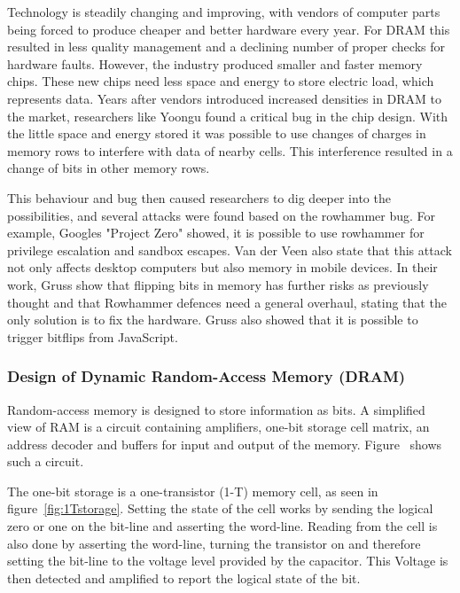 Technology is steadily changing and improving, with vendors of computer parts
being forced to produce cheaper and better hardware every year. For DRAM this
resulted in less quality management and a declining number of proper checks for
hardware faults. However, the industry produced smaller and faster memory chips.
These new chips need less space and energy to store electric load, which
represents data. Years after vendors introduced increased densities in DRAM to
the market, researchers like Yoongu\etal\cite{rowhammeranal, rowhammergeneral}
found a critical bug in the chip design. With the little space and energy stored
it was possible to use changes of charges in memory rows to interfere with data
of nearby cells. This interference resulted in a change of bits in other memory
rows.

This behaviour and bug then caused researchers to dig deeper into the
possibilities, and several attacks were found based on the rowhammer bug. For
example, Google\textquotesingle s "Project Zero" showed\cite{projectzerorow}, it
is possible to use rowhammer for privilege escalation and sandbox escapes. Van
der Veen\etal\cite{drammer} also state that this attack not only affects desktop
computers but also memory in mobile devices. In their work,
Gruss\etal\cite{flipinthewall} show that flipping bits in memory has further
risks as previously thought and that Rowhammer defences need a general overhaul,
stating that the only solution is to fix the hardware.
Gruss\etal\cite{rowhammerjs} also showed that it is possible to trigger bitflips
from JavaScript.

\subsubsection{Design of Dynamic Random-Access Memory (DRAM)}

Random-access memory is designed to store information as bits. A simplified view
of RAM is a circuit containing amplifiers, one-bit storage cell matrix, an
address decoder and buffers for input and output of the memory.
Figure~ shows such a circuit.

The one-bit storage is a one-transistor (1-T) memory cell, as seen in
figure~\ref{fig:1Tstorage}. Setting the state of the cell works by sending the
logical zero or one on the bit-line and asserting the word-line. Reading from
the cell is also done by asserting the word-line, turning the transistor on and
therefore setting the bit-line to the voltage level provided by the capacitor.
This Voltage is then detected and amplified to report the logical state of the
bit.

